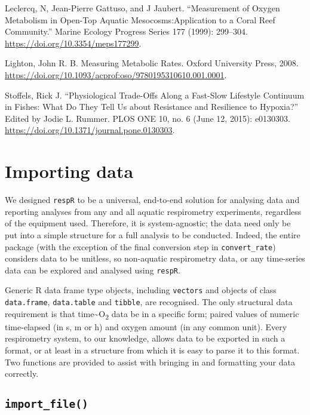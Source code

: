 \documentclass[]{book}
\begin{document}
Leclercq, N, Jean-Pierre Gattuso, and J Jaubert. ``Measurement of Oxygen
Metabolism in Open-Top Aquatic Mesocosms:Application to a Coral Reef
Community.'' Marine Ecology Progress Series 177 (1999): 299--304.
\url{https://doi.org/10.3354/meps177299}.

Lighton, John R. B. Measuring Metabolic Rates. Oxford University Press,
2008. \url{https://doi.org/10.1093/acprof:oso/9780195310610.001.0001}.

Stoffels, Rick J. ``Physiological Trade-Offs Along a Fast-Slow Lifestyle
Continuum in Fishes: What Do They Tell Us about Resistance and
Resilience to Hypoxia?'' Edited by Jodie L. Rummer. PLOS ONE 10, no. 6
(June 12, 2015): e0130303.
\url{https://doi.org/10.1371/journal.pone.0130303}.

\chapter{Importing data}\label{importing-data}

We designed \texttt{respR} to be a universal, end-to-end solution for
analysing data and reporting analyses from any and all aquatic
respirometry experiments, regardless of the equipment used. Therefore,
it is system-agnostic; the data need only be put into a simple structure
for a full analysis to be conducted. Indeed, the entire package (with
the exception of the final conversion step in \texttt{convert\_rate})
considers data to be unitless, so non-aquatic respirometry data, or any
time-series data can be explored and analysed using \texttt{respR}.

Generic R data frame type objects, including \texttt{vectors} and
objects of class \texttt{data.frame}, \texttt{data.table} and
\texttt{tibble}, are recognised. The only structural data requirement is
that time\textasciitilde{}O\textsubscript{2} data be in a specific form;
paired values of numeric time-elapsed (in s, m or h) and oxygen amount
(in any common unit). Every respirometry system, to our knowledge,
allows data to be exported in such a format, or at least in a structure
from which it is easy to parse it to this format. Two functions are
provided to assist with bringing in and formatting your data correctly.

\section{\texorpdfstring{\texttt{import\_file()}}{import\_file()}}\label{import_file}
\end{document}
